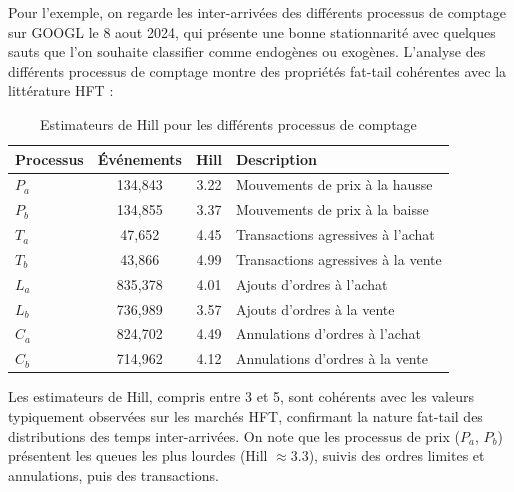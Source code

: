 \documentclass[10pt,a4paper]{article}
\theoremstyle{definition}
\theoremstyle{remark}
\begin{document}
\begin{itemize}
    Pour l'exemple, on regarde les inter-arrivées des différents processus de comptage sur GOOGL le 8 aout 2024, qui présente une bonne stationnarité avec quelques sauts que l'on souhaite classifier comme endogènes ou exogènes. L'analyse des différents processus de comptage montre des propriétés fat-tail cohérentes avec la littérature HFT :

    \begin{table}[h!]
    \centering
    \begin{tabular}{|l|c|c|l|}
    \hline
    \textbf{Processus} & \textbf{Événements} & \textbf{Hill} & \textbf{Description} \\
    \hline
    $P_a$ & 134,843 & 3.22 & Mouvements de prix à la hausse \\
    $P_b$ & 134,855 & 3.37 & Mouvements de prix à la baisse \\
    $T_a$ & 47,652 & 4.45 & Transactions agressives à l'achat \\
    $T_b$ & 43,866 & 4.99 & Transactions agressives à la vente \\
    $L_a$ & 835,378 & 4.01 & Ajouts d'ordres à l'achat \\
    $L_b$ & 736,989 & 3.57 & Ajouts d'ordres à la vente \\
    $C_a$ & 824,702 & 4.49 & Annulations d'ordres à l'achat \\
    $C_b$ & 714,962 & 4.12 & Annulations d'ordres à la vente \\
    \hline
    \end{tabular}
    \caption{Estimateurs de Hill pour les différents processus de comptage}
    \label{tab:hill_estimates}
    \end{table}

    Les estimateurs de Hill, compris entre 3 et 5, sont cohérents avec les valeurs typiquement observées sur les marchés HFT, confirmant la nature fat-tail des distributions des temps inter-arrivées. On note que les processus de prix ($P_a$, $P_b$) présentent les queues les plus lourdes (Hill $\approx 3.3$), suivis des ordres limites et annulations, puis des transactions.


\end{itemize}
\end{document}
